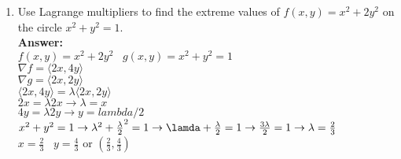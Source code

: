 \documentclass[11pt]{article}
\begin{document}
\begin{enumerate}
    
    
    \item Use Lagrange multipliers to find the extreme values of $f(x,y) = x^2 +2y^2$ on the circle $x^2+y^2 = 1$.  
    \\
    \textbf{Answer:}
    \\
    $f(x,y)=x^2+2y^2 \; \; \; g(x,y)=x^2+y^2=1$
    \\
    $\nabla f= \langle 2x, 4y \rangle $
    \\
    $\nabla g= \langle 2x, 2y \rangle$
    \\
    $\langle 2x, 4y \rangle= \lambda \langle 2x, 2y \rangle$
    \\
    $2x= \lambda 2x \rightarrow \lambda=x$
    \\
    $4y= \lambda 2y \rightarrow y= lambda/2$
    \\
    $x^2+y^2 = 1 \rightarrow \lambda^2+\frac{\lambda}{2}^2=1 \rightarrow \lamda + \frac{\lambda}{2}=1 \rightarrow \frac{3 \lambda}{2}=1 \rightarrow \lambda= \frac{2}{3}$
    \\
    $x=\frac{2}{3} \; \; \; y= \frac{4}{3}$ or $(\frac{2}{3}, \frac{4}{3})$
    
    
    
\end{enumerate}
\end{document}

